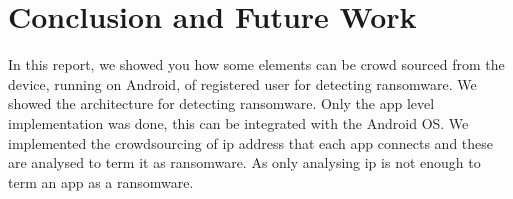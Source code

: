 \chapter{Conclusion and Future Work}

In this report, we showed you how some elements can be crowd sourced from the device, running on Android, of registered user for detecting ransomware.
We showed the architecture for detecting ransomware.
Only the app level implementation was done, this can be integrated with the Android OS.
We implemented the crowdsourcing of ip address that each app connects and these are analysed to term it as ransomware.
As only analysing ip is not enough to term an app as a ransomware.